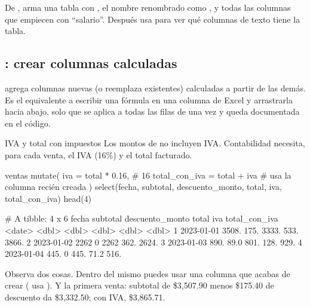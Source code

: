\begin{hazlotu}
De , arma una tabla con , el nombre
renombrado como , y todas las columnas que empiecen con
``salario''. Después usa  para ver qué
columnas de texto tiene la tabla.
\end{hazlotu}

\subsection{\texorpdfstring{}{mutate()}: crear columnas calculadas}
\label{sec:m2-mutate}

 agrega columnas nuevas (o reemplaza existentes) calculadas
a partir de las demás. Es el equivalente a escribir una fórmula en una
columna de Excel y arrastrarla hacia abajo, solo que se aplica a todas las
filas de una vez y queda documentada en el código.

\begin{ejemplo}{IVA y total con impuestos}
Los montos de  no incluyen IVA. Contabilidad necesita, para
cada venta, el IVA (16\%) y el total facturado.
\end{ejemplo}

\begin{rcode}
ventas %
  mutate(
    iva            = total * 0.16,        # 16%
    total_con_iva  = total + iva          # usa la columna recién creada
  ) %
  select(fecha, subtotal, descuento_monto, total, iva, total_con_iva) %
  head(4)
\end{rcode}
\begin{rsalida}
# A tibble: 4 x 6
  fecha      subtotal descuento_monto total   iva total_con_iva
  <date>        <dbl>           <dbl> <dbl> <dbl>         <dbl>
1 2023-01-01    3508.           175.  3333. 533.          3866.
2 2023-01-02    2262              0   2262  362.          2624.
3 2023-01-03     890.            89.0  801. 128.           929.
4 2023-01-04     445.             0    445.  71.2          516.
\end{rsalida}

Observa dos cosas. Dentro del mismo  puedes usar una
columna que acabas de crear ( usa ). Y la
primera venta: subtotal de \$3,507.90 menos \$175.40 de descuento da
\$3,332.50; con IVA, \$3,865.71.

